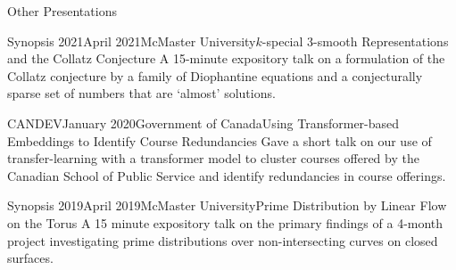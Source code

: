\begin{rSection}{Other Presentations}

\begin{rSubsection}{Synopsis 2021}{April 2021}{McMaster University}{$k$-special $3$-smooth Representations and the Collatz Conjecture}
	A 15-minute expository talk on a formulation of the Collatz conjecture by a family of Diophantine equations and a conjecturally sparse set of numbers that are `almost' solutions.
\end{rSubsection}
\smallskip

\begin{rSubsection}{CANDEV}{January 2020}{Government of Canada}{Using Transformer-based Embeddings to  Identify Course Redundancies}
	Gave a short talk on our use of transfer-learning with a transformer model to cluster courses offered by the Canadian School of Public Service and identify redundancies in course offerings.
\end{rSubsection}
\smallskip

\begin{rSubsection}{Synopsis 2019}{April 2019}{McMaster University}{Prime Distribution by Linear Flow on the Torus}
	A 15 minute expository talk on the primary findings of a 4-month project investigating prime distributions over non-intersecting curves on closed surfaces.
\end{rSubsection}
\smallskip






\end{rSection}
